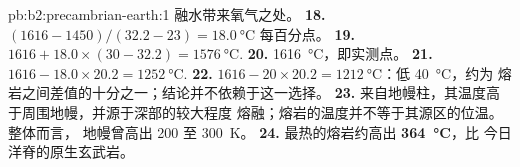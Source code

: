 \begin{solution}{pb:b2:precambrian-earth:1}
融水带来氧气之处。
\textbf{18.} $(1616 - 1450)/(32.2 - 23) = \qty{18.0}{\celsius}$ 每百分点。
\textbf{19.} $1616 + 18.0\times(30 - 32.2) = \qty{1576}{\celsius}$.
\textbf{20.} \qty{1616}{\celsius}，即实测点。
\textbf{21.} $1616 - 18.0\times20.2 = \qty{1252}{\celsius}$.
\textbf{22.} $1616 - 20\times20.2 = \qty{1212}{\celsius}$：低 \qty{40}{\celsius}，约为
熔岩之间差值的十分之一；结论并不依赖于这一选择。
\textbf{23.} 来自地幔柱，其温度高于周围地幔，并源于深部的较大程度
熔融；熔岩的温度并不等于其源区的位温。整体而言，
地幔曾高出 200 至 \qty{300}{K}。
\textbf{24.} 最热的熔岩约高出 \textbf{\qty{364}{\celsius}}，比
今日洋脊的原生玄武岩。
\end{solution}
